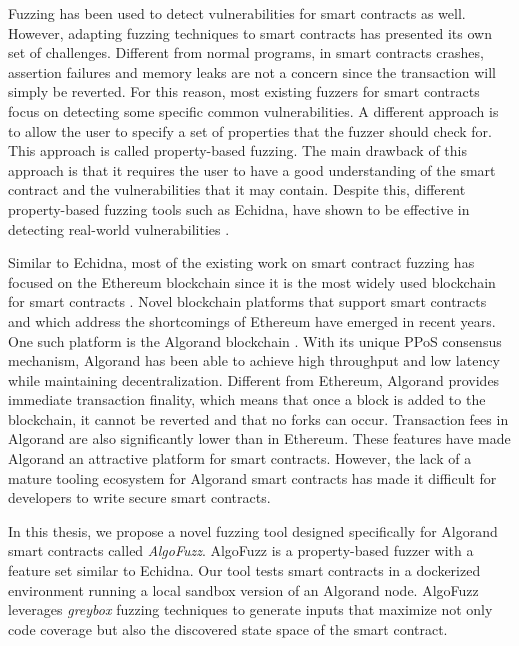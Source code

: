 Fuzzing has been used to detect vulnerabilities for smart contracts as well.
However, adapting fuzzing techniques to smart contracts has presented its own set of challenges.
Different from normal programs, in smart contracts crashes, assertion failures and memory leaks are not a concern since the transaction will simply be reverted.
For this reason, most existing fuzzers for smart contracts focus on detecting some specific common vulnerabilities.
A different approach is to allow the user to specify a set of properties that the fuzzer should check for.
This approach is called property-based fuzzing.
The main drawback of this approach is that it requires the user to have a good understanding of the smart contract and the vulnerabilities that it may contain.
Despite this, different property-based fuzzing tools such as Echidna, have shown to be effective in detecting real-world vulnerabilities \cite{grieco_echidna_2020, noauthor_echidna_nodate}.

Similar to Echidna, most of the existing work on smart contract fuzzing has focused on the Ethereum blockchain since it is the most widely used blockchain for smart contracts \cite{guo_analysis_2022}.
Novel blockchain platforms that support smart contracts and which address the shortcomings of Ethereum have emerged in recent years.
One such platform is the Algorand blockchain \cite{chen_algorand_2019}.
With its unique \ac{PPoS} consensus mechanism, Algorand has been able to achieve high throughput and low latency while maintaining decentralization.
Different from Ethereum, Algorand provides immediate transaction finality, which means that once a block is added to the blockchain, it cannot be reverted and that no forks can occur.
Transaction fees in Algorand are also significantly lower than in Ethereum.
These features have made Algorand an attractive platform for smart contracts.
However, the lack of a mature tooling ecosystem for Algorand smart contracts has made it difficult for developers to write secure smart contracts.

In this thesis, we propose a novel fuzzing tool designed specifically for Algorand smart contracts called \textit{AlgoFuzz}.
AlgoFuzz is a property-based fuzzer with a feature set similar to Echidna.
Our tool tests smart contracts in a dockerized environment running a local sandbox version of an Algorand node.
AlgoFuzz leverages \textit{greybox} fuzzing techniques to generate inputs that maximize not only code coverage but also the discovered state space of the smart contract.

